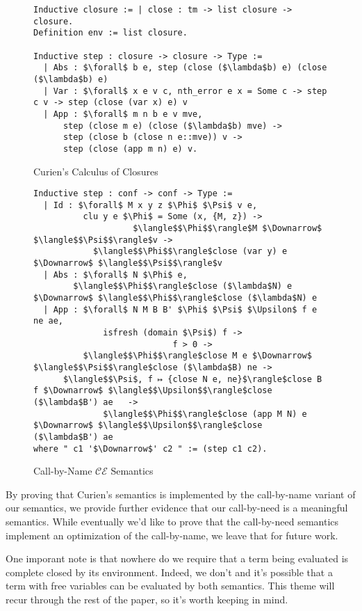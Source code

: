 \begin{figure}
\begin{lstlisting}
Inductive closure := | close : tm -> list closure -> closure. 
Definition env := list closure.

Inductive step : closure -> closure -> Type := 
  | Abs : $\forall$ b e, step (close ($\lambda$b) e) (close ($\lambda$b) e)
  | Var : $\forall$ x e v c, nth_error e x = Some c -> step c v -> step (close (var x) e) v
  | App : $\forall$ m n b e v mve,
      step (close m e) (close ($\lambda$b) mve) ->
      step (close b (close n e::mve)) v ->
      step (close (app m n) e) v.
\end{lstlisting}
\caption{Curien's Calculus of Closures}
\label{fig:curien}
\end{figure}


\begin{figure}
\begin{lstlisting}
Inductive step : conf -> conf -> Type :=
  | Id : $\forall$ M x y z $\Phi$ $\Psi$ v e, 
          clu y e $\Phi$ = Some (x, {M, z}) -> 
                    $\langle$$\Phi$$\rangle$M $\Downarrow$ $\langle$$\Psi$$\rangle$v ->
            $\langle$$\Phi$$\rangle$close (var y) e $\Downarrow$ $\langle$$\Psi$$\rangle$v
  | Abs : $\forall$ N $\Phi$ e, 
        $\langle$$\Phi$$\rangle$close ($\lambda$N) e $\Downarrow$ $\langle$$\Phi$$\rangle$close ($\lambda$N) e
  | App : $\forall$ N M B B' $\Phi$ $\Psi$ $\Upsilon$ f e ne ae, 
              isfresh (domain $\Psi$) f -> 
                            f > 0 ->
          $\langle$$\Phi$$\rangle$close M e $\Downarrow$ $\langle$$\Psi$$\rangle$close ($\lambda$B) ne -> 
      $\langle$$\Psi$, f ↦ {close N e, ne}$\rangle$close B f $\Downarrow$ $\langle$$\Upsilon$$\rangle$close ($\lambda$B') ae   ->
              $\langle$$\Phi$$\rangle$close (app M N) e $\Downarrow$ $\langle$$\Upsilon$$\rangle$close ($\lambda$B') ae
where " c1 '$\Downarrow$' c2 " := (step c1 c2).
\end{lstlisting}
\caption{Call-by-Name $\mathcal{CE}$ Semantics}
\label{fig:bigstepname}
\end{figure}

By proving that Curien's semantics is implemented by the call-by-name variant of
our semantics, we provide further evidence that our call-by-need is a
meaningful semantics. While eventually we'd like to prove that the call-by-need
semantics implement an optimization of the call-by-name, we leave that for
future work.

One imporant note is that nowhere do we require that a term being evaluated is
complete closed by its environment. Indeed, we don't and it's possible that a
term with free variables can be evaluated by both semantics. This theme will
recur through the rest of the paper, so it's worth keeping in mind.  
